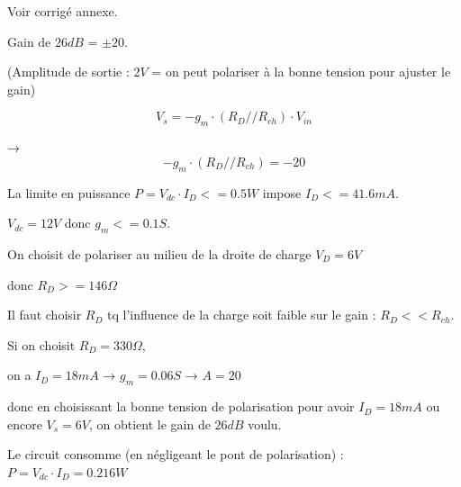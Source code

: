 \documentclass{../template/tp}
\begin{document}
{
Voir corrigé annexe.

Gain de $26dB$ = $\pm 20$.

(Amplitude de sortie : $2V$ = on peut polariser à la bonne tension pour ajuster le gain)



$$V_s=-g_m\cdot \left( R_D//R_{ch} \right) \cdot V_{in}$$

→ $$-g_m\cdot \left( R_D//R_{ch}\right) =-20$$





La limite en puissance $P=V_{dc}\cdot I_D<=0.5W$ impose $I_D<=41.6mA$.

$V_{dc}=12V$ donc $g_m<=0.1S$.

On choisit de polariser au milieu de la droite de charge $V_D=6V$

donc $R_D>=146\Omega$

Il faut choisir $R_D$ tq l'influence de la charge soit faible sur le gain : $R_D<<R_{ch}$.

Si on choisit $R_D=330\Omega$,

on a $I_D=18mA$ → $g_m=0.06S$ → $A= 20$

donc en choisissant la bonne tension de polarisation pour avoir $I_D=18mA$ ou encore $V_s=6V$, on obtient le gain de $26dB$ voulu.

Le circuit consomme (en négligeant le pont de polarisation) : $P=V_{dc}\cdot I_D=0.216W$
}
\end{document}
